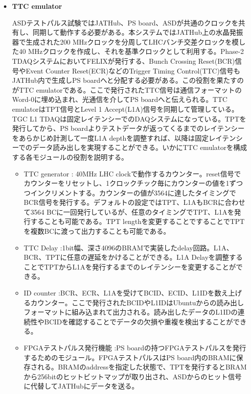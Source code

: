 \begin{itemize}
    \item \textbf{TTC emulator} \par
    ASDテストパルス試験ではJATHub、PS board、ASDが共通のクロックを共有し、同期して動作する必要がある。本システムではJATHub上の水晶発振器で生成された200 MHzクロックを分周してLHCバンチ交差クロックを模した40 MHzクロックを作成し、それを基準クロックとして利用する。Phase-2 TDAQシステムにおいてFELIXが発行する、Bunch Crossing Reset(BCR)信号やEvent Counter Reset(ECR)などのTrigger Timing Control(TTC)信号もJATHub内で生成しPS boardへと分配する必要がある。この役割を果たすのがTTC emulatorである。ここで発行されたTTC信号は通信フォーマットのWord-0に埋め込まれ、光通信を介してPS boardへと伝えられる。TTC emulatorはTPT信号とLevel 1 Accept(L1A)信号を同期して管理している。TGC L1 TDAQは固定レイテンシーでのDAQシステムになっている。TPTを発行してから、PS boardよりテストデータが返ってくるまでのレイテンシーをあらかじめ計測して一度L1A depthを調整すれば、以降は固定レイテンシーでのデータ読み出しを実現することができる。いかにTTC emulatorを構成する各モジュールの役割を説明する。
    \baselineskip

    \begin{itemize}
        \item {TTC generator :} 40MHz LHC clockで動作するカウンター。reset信号でカウンターをリセットし、1クロックチック毎にカウンターの値を1ずつつインクリメントする。カウンターの値が3564に達したタイミングでBCR信号を発行する。デフォルトの設定ではTPT、L1AもBCRに合わせて3564 BCに一回発行しているが、任意のタイミングでTPT、L1Aを発行することも可能である。TPT lengthを変更することですることでTPTを複数BCに渡って出力することも可能である。
        \baselineskip

        \item{TTC Delay :}1bit幅、深さ4096のBRAMで実装したdelay回路。L1A、BCR、TPTに任意の遅延をかけることができる。L1A Delayを調整することでTPTからL1Aを発行するまでのレイテンシーを変更することができる。
        \baselineskip

        \item{ID counter :}BCR、ECR、L1Aを受けてBCID、ECID、L1IDを数え上げるカウンター。ここで発行されたBCIDやL1IDはUbuntuからの読み出しフォーマットに組み込まれて出力される。読み出したデータのL1IDの連続性やBCIDを確認することでデータの欠損や重複を検出することができる。
        \baselineskip
        
        \item{FPGAテストパルス発行機能 :}PS boardの持つFPGAテストパルスを発行するためのモジュール。FPGAテストパルスはPS board内のBRAMに保存される。BRAMのaddressを指定した状態で、TPTを発行するとBRAMから256bitのヒットビットマップが取り出され、ASDからのヒット信号に代替してJATHubにデータを送る。
        \baselineskip
    \end{itemize}


\end{itemize}
